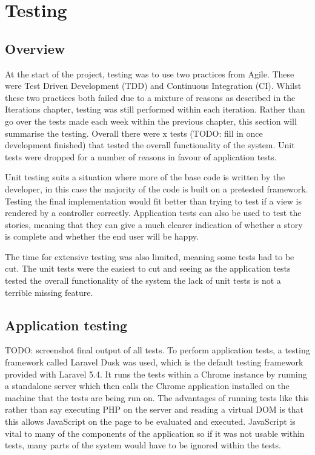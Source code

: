 \chapter{Testing}

\section{Overview}
At the start of the project, testing was to use two practices from Agile. These were Test Driven Development (TDD) and Continuous Integration (CI). Whilst these two practices both failed due to a mixture of reasons as described in the Iterations chapter, testing was still performed within each iteration. Rather than go over the tests made each week within the previous chapter, this section will summarise the testing. Overall there were x tests (TODO: fill in once development finished) that tested the overall functionality of the system. Unit tests were dropped for a number of reasons in favour of application tests.

Unit testing suits a situation where more of the base code is written by the developer, in this case the majority of the code is built on a pretested framework. Testing the final implementation would fit better than trying to test if a view is rendered by a controller correctly. Application tests can also be used to test the stories, meaning that they can give a much clearer indication of whether a story is complete and whether the end user will be happy. 

The time for extensive testing was also limited, meaning some tests had to be cut. The unit tests were the easiest to cut and seeing as the application tests tested the overall functionality of the system the lack of unit tests is not a terrible missing feature. 

\section{Application testing}
TODO: screenshot final output of all tests.
To perform application tests, a testing framework called Laravel Dusk was used, which is the default testing framework provided with Laravel 5.4\cite{dusk}\cite{dusk-desc}. It runs the tests within a Chrome instance by running a standalone server which then calls the Chrome application installed on the machine that the tests are being run on. The advantages of running tests like this rather than say executing PHP on the server and reading a virtual DOM is that this allows JavaScript on the page to be evaluated and executed. JavaScript is vital to many of the components of the application so if it was not usable within tests, many parts of the system would have to be ignored within the tests.

